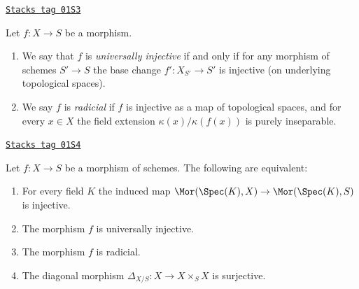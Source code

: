 \begin{definition}
\label{morphisms-definition-universally-injective}
\href{https://stacks.math.columbia.edu/tag/01S3}{\texttt{Stacks tag 01S3}}

Let $f : X \to S$ be a morphism.
\begin{enumerate}
\item We say that $f$ is {\it universally injective} if and only
if for any morphism of schemes $S' \to S$ the base change
$f' : X_{S'} \to S'$ is injective (on underlying topological spaces).
\item We say $f$ is {\it radicial} if $f$ is injective as a
map of topological spaces, and for every $x \in X$ the field
extension $\kappa(x)/\kappa(f(x))$ is purely inseparable.
\end{enumerate}
\end{definition}

\begin{lemma}
\label{morphisms-lemma-universally-injective}
\href{https://stacks.math.columbia.edu/tag/01S4}{\texttt{Stacks tag 01S4}}

\begin{reference}
\cite[Proposition 3.7.1]{EGA1-second}
\end{reference}
Let $f : X \to S$ be a morphism of schemes.
The following are equivalent:
\begin{enumerate}
\item For every field $K$ the induced map
$\Mor(\Spec(K), X) \to \Mor(\Spec(K), S)$
is injective.
\item The morphism $f$ is universally injective.
\item The morphism $f$ is radicial.
\item The diagonal morphism $\Delta_{X/S} : X \longrightarrow X \times_S X$
is surjective.
\end{enumerate}
\end{lemma}

